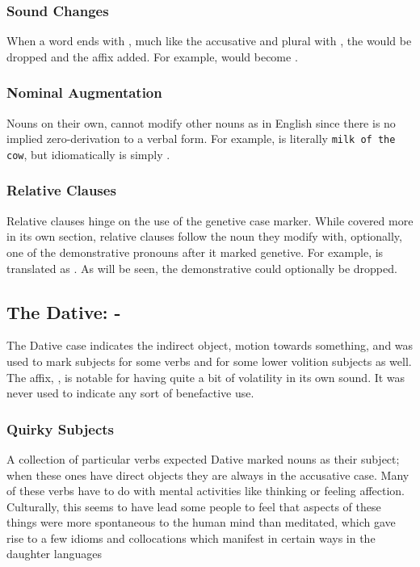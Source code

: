   \subsubsection{Sound Changes}
  When a word ends with , much like the accusative and plural with , the  would be dropped and the affix added. For example,  would become .
  \subsubsection{Nominal Augmentation}
  Nouns on their own, cannot modify other nouns as in English since there is no implied zero-derivation to a verbal form. For example,  is literally \texttt{milk of the cow}, but idiomatically is simply .
  \subsubsection{Relative Clauses}
  Relative clauses hinge on the use of the genetive case marker. While covered more in its own section, relative clauses follow the noun they modify with, optionally, one of the demonstrative pronouns after it marked genetive. For example,  is translated as . As will be seen, the demonstrative could optionally be dropped.

\subsection{The Dative: \textbf{-\dat}}
The Dative case indicates the indirect object, motion towards something, and was used to mark subjects for some verbs and for some lower volition subjects as well. The affix, \suffixtext{\dat}, is notable for having quite a bit of volatility in its own sound. It was never used to indicate any sort of benefactive use.
  \subsubsection{Quirky Subjects}
  A collection of particular verbs expected Dative marked nouns as their subject; when these ones have direct objects they are always in the accusative case. Many of these verbs have to do with mental activities like thinking or feeling affection. Culturally, this seems to have lead some people to feel that aspects of these things were more spontaneous to the human mind than meditated, which gave rise to a few idioms and collocations which manifest in certain ways in the daughter languages
